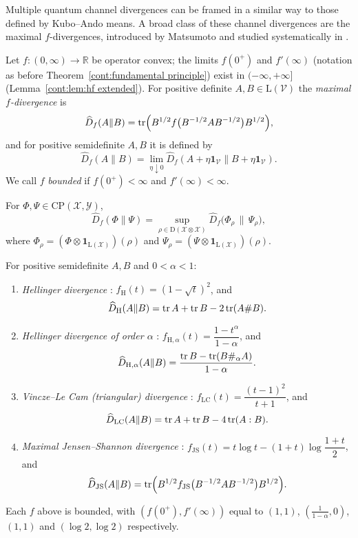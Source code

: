 Multiple quantum channel divergences can be framed in a similar way to those defined by Kubo--Ando means. A broad class of these channel divergences are the maximal $f$-divergences, introduced by Matsumoto \cite{Matsumoto2018newf} and studied systematically in \cite{HiaiMosonyi2017,Hiai2019maximal}. 
\begin{definition}\label{cont:def:maxf}
Let $f:(0,\infty)\to\mathbb{R}$ be operator convex; the limits $f(0^+)$ and $f'(\infty)$ (notation as before Theorem~\ref{cont:fundamental principle}) exist in $(-\infty,+\infty]$ (Lemma~\ref{cont:lem:hf extended}).
For positive definite $A,B\in \mathrm{L}(\mathcal{V})$ the \emph{maximal $f$-divergence} is
\[
\widehat{D}_f(A\|B)=\operatorname{tr}\!\Big(B^{1/2}f\big(B^{-1/2}AB^{-1/2}\big)B^{1/2}\Big),
\]
and for positive semidefinite $A,B$ it is defined by
\[
\widehat{D}_f(A\|B)=\lim_{\eta\downarrow0}\widehat{D}_f(A+\eta\mathbf{1}_{\mathcal{V}}\|B+\eta\mathbf{1}_{\mathcal{V}}).
\]
We call $f$ \emph{bounded} if $f(0^+)<\infty$ and $f'(\infty)<\infty$.
\end{definition}
 
\begin{definition}\label{cont:def:maxf maps}
For $\Phi,\Psi\in \mathrm{CP}(\mathcal{X},\mathcal{Y})$,
\[
\widehat{D}_f(\Phi\|\Psi)=\sup_{\rho\in \mathrm{D}(\mathcal{X}\otimes\mathcal{X})}
\widehat{D}_f\big(\Phi_\rho\,\|\,\Psi_\rho\big),
\]
where $\Phi_\rho=(\Phi\otimes\mathbf{1}_{\mathrm{L}(\mathcal{X})})(\rho)$ and $\Psi_\rho=(\Psi\otimes\mathbf{1}_{\mathrm{L}(\mathcal{X})})(\rho)$.
\end{definition}
 
\begin{definition}[Examples]
For positive semidefinite $A,B$ and $0<\alpha<1$:
\begin{enumerate}
\item \emph{Hellinger divergence} \cite{BhatiaGaubertJain2019,PitrikVirosztek2020}: $f_{\mathrm{H}}(t)=(1-\sqrt{t})^2$, and
\[
\widehat{D}_{\mathrm{H}}(A\|B)=\operatorname{tr} A+\operatorname{tr} B-2\operatorname{tr}(A\#B).
\]
\item \emph{Hellinger divergence of order $\alpha$} \cite{LieseVajda2006}: $f_{\mathrm{H},\alpha}(t)=\dfrac{1-t^\alpha}{1-\alpha}$, and
\[
\widehat{D}_{\mathrm{H},\alpha}(A\|B)=\frac{\operatorname{tr} B-\operatorname{tr}(B\#_\alpha A)}{1-\alpha}.
\]
\item \emph{Vincze--Le Cam (triangular) divergence} \cite{LieseVajda2006}: $f_{\mathrm{LC}}(t)=\dfrac{(t-1)^2}{t+1}$, and
\[
\widehat{D}_{\mathrm{LC}}(A\|B)=\operatorname{tr} A+\operatorname{tr} B-4\operatorname{tr}(A:B).
\]
\item \emph{Maximal Jensen--Shannon divergence} \cite{Lin1991}: $f_{\mathrm{JS}}(t)=t\log t-(1+t)\log\dfrac{1+t}{2}$, and
\[
\widehat{D}_{\mathrm{JS}}(A\|B)=\operatorname{tr}\!\Big(B^{1/2}f_{\mathrm{JS}}\big(B^{-1/2}AB^{-1/2}\big)B^{1/2}\Big).
\]
\end{enumerate}
Each $f$ above is bounded, with $(f(0^+),f'(\infty))$ equal to $(1,1)$, $(\tfrac{1}{1-\alpha},0)$, $(1,1)$ and $(\log2,\log2)$ respectively.
\end{definition}
 

